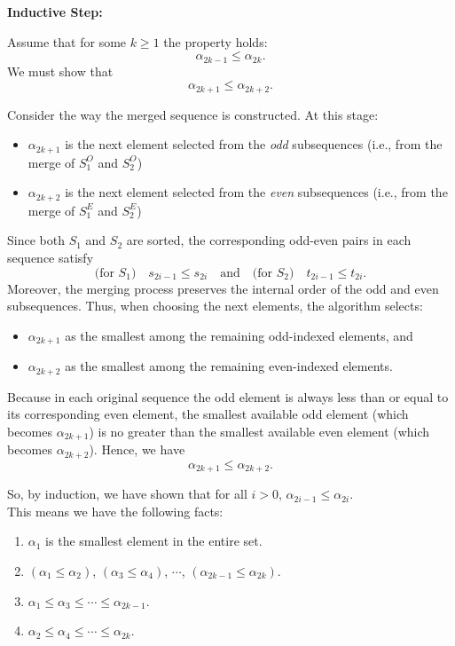 \documentclass[a4paper]{article}
\begin{document}
\noindent \textbf{Inductive Step:} 

\noindent Assume that for some \( k \ge 1 \) the property holds:
\[
\alpha_{2k-1} \le \alpha_{2k}.
\]
We must show that
\[
\alpha_{2k+1} \le \alpha_{2k+2}.
\]

\noindent Consider the way the merged sequence is constructed. At this stage:
\begin{itemize}
    \item \( \alpha_{2k+1} \) is the next element selected from the \emph{odd} subsequences (i.e., from the merge of \( S_1^O \) and \( S_2^O \))
    \item \( \alpha_{2k+2} \) is the next element selected from the \emph{even} subsequences (i.e., from the merge of \( S_1^E \) and \( S_2^E \))\\
\end{itemize}

\noindent Since both \( S_1 \) and \( S_2 \) are sorted, the corresponding odd-even pairs in each sequence satisfy
\[
\text{(for } S_1\text{)}\quad s_{2i-1} \le s_{2i} \quad \text{and} \quad \text{(for } S_2\text{)}\quad t_{2i-1} \le t_{2i}.
\]
\noindent Moreover, the merging process preserves the internal order of the odd and even subsequences. Thus, when choosing the next elements, the algorithm selects:
\begin{itemize}
    \item \( \alpha_{2k+1} \) as the smallest among the remaining odd-indexed elements, and
    \item \( \alpha_{2k+2} \) as the smallest among the remaining even-indexed elements.
\end{itemize}

\noindent Because in each original sequence the odd element is always less than or equal to its corresponding even element, the smallest available odd element (which becomes \( \alpha_{2k+1} \)) is no greater than the smallest available even element (which becomes \( \alpha_{2k+2} \)). Hence, we have
\[
\alpha_{2k+1} \le \alpha_{2k+2}.
\]

\noindent So, by induction, we have shown that for all \( i > 0 \), \( \alpha_{2i-1} \le \alpha_{2i} \).\\

\noindent This means we have the following facts:
\begin{enumerate}
    \item $\alpha_1$ is the smallest element in the entire set.
    \item $\left(\alpha_1 \leq \alpha_2\right)$, $\left(\alpha_3 \leq \alpha_4\right)$, $\cdots$, $\left(\alpha_{2k - 1} \leq \alpha_{2k}\right)$.
    \item $\alpha_1 \leq \alpha_3 \leq \cdots \leq \alpha_{2k - 1}$.
    \item $\alpha_2 \leq \alpha_4 \leq \cdots \leq \alpha_{2k}$.
\end{enumerate}
\end{document}
